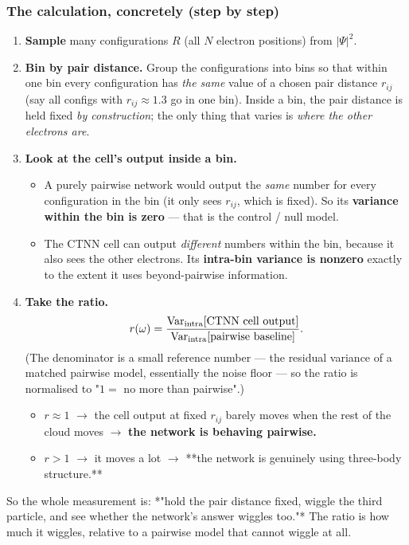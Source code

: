 \documentclass[11pt]{article}
\begin{document}
\subsubsection*{The calculation, concretely (step by step)}

\begin{enumerate}
\item \textbf{Sample} many configurations $R$ (all $N$ electron positions) from
$|\Psi|^2$.
\item \textbf{Bin by pair distance.} Group the configurations into bins so that
within one bin every configuration has \emph{the same} value of a chosen pair
distance $r_{ij}$ (say all configs with $r_{ij} \approx 1.3$ go in one
bin). Inside a bin, the pair distance is held fixed \emph{by construction};
the only thing that varies is \emph{where the other electrons are}.
\item \textbf{Look at the cell's output inside a bin.}
\begin{itemize}
\item A purely pairwise network would output the \emph{same} number for every
configuration in the bin (it only sees $r_{ij}$, which is fixed). So
its \textbf{variance within the bin is zero} --- that is the control / null
model.
\item The CTNN cell can output \emph{different} numbers within the bin, because it
also sees the other electrons. Its \textbf{intra-bin variance is nonzero}
exactly to the extent it uses beyond-pairwise information.
\end{itemize}
\item \textbf{Take the ratio.}
\[r(\omega) = \frac{\mathrm{Var}_{\rm intra}[\text{CTNN cell output}]}
   {\mathrm{Var}_{\rm intra}[\text{pairwise baseline}]}.\]
(The denominator is a small reference number --- the residual variance of
a matched pairwise model, essentially the noise floor --- so the ratio is
normalised to "$1 =$ no more than pairwise".)
\begin{itemize}
\item $r \approx 1$ $\to$ the cell output at fixed $r_{ij}$ barely moves when the
rest of the cloud moves $\to$ \textbf{the network is behaving pairwise.}
\item $r > 1$ $\to$ it moves a lot $\to$ **the network is genuinely using
three-body structure.**
\end{itemize}
\end{enumerate}
So the whole measurement is: *"hold the pair distance fixed, wiggle the
third particle, and see whether the network's answer wiggles too."* The
ratio is how much it wiggles, relative to a pairwise model that cannot
wiggle at all.
\end{document}
